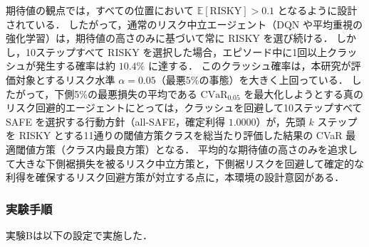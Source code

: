 \documentclass[a4paper,10pt]{jsarticle}
\theoremstyle{definition}
\newcommand{\CVaR}{\mathrm{CVaR}}
\newcommand{\E}{\mathbb{E}}
\begin{document}
期待値の観点では，すべての位置において $\E[\mathrm{RISKY}] > 0.1$ となるように設計されている．
したがって，通常のリスク中立エージェント（DQN や平均重視の強化学習）は，期待値の高さのみに基づいて常に RISKY を選び続ける．
しかし，10ステップすべて RISKY を選択した場合，エピソード中に1回以上クラッシュが発生する確率は約 $10.4\%$ に達する．
このクラッシュ確率は，本研究が評価対象とするリスク水準 $\alpha=0.05$（最悪5\%の事態）を大きく上回っている．
したがって，下側5\%の最悪損失の平均である $\CVaR_{0.05}$ を最大化しようとする真のリスク回避的エージェントにとっては，クラッシュを回避して10ステップすべて SAFE を選択する行動方針（all-SAFE，確定利得 $1.0000$）が，先頭 $k$ ステップを RISKY とする11通りの閾値方策クラスを総当たり評価した結果の CVaR 最適閾値方策（クラス内最良方策）となる．
平均的な期待値の高さのみを追求して大きな下側裾損失を被るリスク中立方策と，下側裾リスクを回避して確定的な利得を確保するリスク回避方策が対立する点に，本環境の設計意図がある．

\subsubsection{実験手順}
実験Bは以下の設定で実施した．
\end{document}

